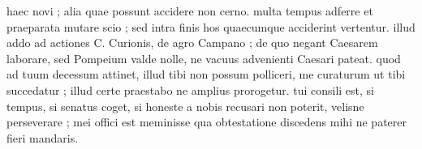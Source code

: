  haec novi ; alia quae possunt accidere non cerno. multa tempus adferre et praeparata mutare scio ; sed intra finis hos quaecumque acciderint vertentur. illud addo ad actiones C. Curionis, de agro Campano ; de quo negant Caesarem laborare, sed Pompeium valde nolle, ne vacuus advenienti Caesari pateat. quod ad tuum decessum attinet, illud tibi non possum polliceri, me curaturum ut tibi succedatur ; illud certe praestabo ne amplius prorogetur. tui consili est, si tempus, si senatus coget, si honeste a nobis recusari non poterit, velisne perseverare ; mei offici est meminisse qua obtestatione discedens mihi ne paterer fieri mandaris.
